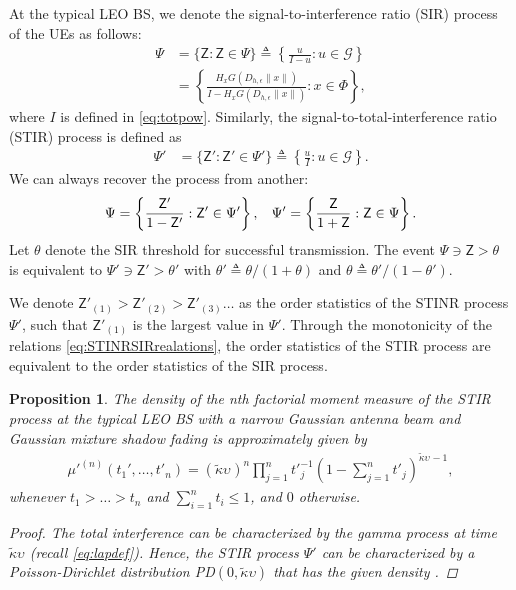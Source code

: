 \documentclass[lettersize,journal]{IEEEtran}
\newtheorem{prop}[theorem]{Proposition}
\begin{document}
 At the typical LEO BS, we denote the signal-to-interference ratio (SIR) process of the UEs as follows:
\begin{align}
  \label{eq:SINR}
  \Psi &= \{\mathsf{Z}: \mathsf{Z} \in \Psi\} \triangleq \left\{ \frac{u}{I-u} : u \in \mathcal{G}\right\} \nonumber \\
  &=\left\{ \frac{H_x G(D_{h,\epsilon}\|x\|)}{I-H_x G(D_{h,\epsilon}\|x\|)} : x \in \Phi\right\},
\end{align}
where $I$ is defined in \eqref{eq:totpow}. Similarly, the signal-to-total-interference ratio (STIR) process is defined as
\begin{align}
  \label{eq:STINR}
  \Psi' &= \{\mathsf{Z}': \mathsf{Z}' \in \Psi'\} \triangleq \left\{ \frac{u}{I} : u \in \mathcal{G}\right\}.
\end{align}
We can always recover the process from another:
\begin{equation}
  \label{eq:STINRSIRrealations}
  \Psi = \left\{ \frac{\mathsf{Z}'}{1- \mathsf{Z}'}: \mathsf{Z}' \in \Psi' \right\}, \hspace{0.3cm} \Psi' = \left\{ \frac{\mathsf{Z}}{1+ \mathsf{Z}}: \mathsf{Z} \in \Psi \right\}.
\end{equation}
Let $\theta$ denote the SIR threshold for successful transmission. The event $\Psi \ni\mathsf{Z}> \theta$ is equivalent to $\Psi' \ni \mathsf{Z}'> \theta'$  with $\theta' \triangleq \theta/(1+\theta)$ and $\theta \triangleq \theta'/(1-\theta')$. 
    
We denote $\mathsf{Z}'_{(1)}>\mathsf{Z}'_{(2)} >\mathsf{Z}'_{(3)} \dots$ as the order statistics of the STINR process $\Psi'$, such that $\mathsf{Z}'_{(1)}$ is the largest value in $\Psi'$. Through the monotonicity of the relations \eqref{eq:STINRSIRrealations}, the order statistics of the STIR process are equivalent to the order statistics of the SIR process.


\begin{prop}
  The density of the n\textit{th} factorial moment measure of the STIR process at the typical LEO BS with a narrow Gaussian antenna beam and Gaussian mixture shadow fading is approximately given by
  \begin{align}
    \label{eq:factorialmoment}
    \mu'^{(n)}(t_1',\dots,t'_n) = (\tilde{\kappa}\upsilon_{})^n\prod_{j=1}^n{t'}_{j}^{-1}\left(1- \sum_{j=1}^nt'_j \right)^{\tilde{\kappa}\upsilon_{}-1},       
  \end{align}
  whenever $t_1>\dots >t_n$ and $\sum_{i=1}^n t_i \leq 1$, and $0$ otherwise.
  \begin{proof}
    The total interference can be characterized by the gamma process at time $\tilde{\kappa}\upsilon$ \cite[Eq. 8]{pitman1997two} (recall \eqref{eq:lapdef}). Hence, the STIR process $\Psi'$ can be characterized by a Poisson-Dirichlet distribution PD$(0,\tilde{\kappa}\upsilon)$ that has the given density \cite[Eq. 2.3]{handa2009two}.
  \end{proof}
\end{prop}
\end{document}
